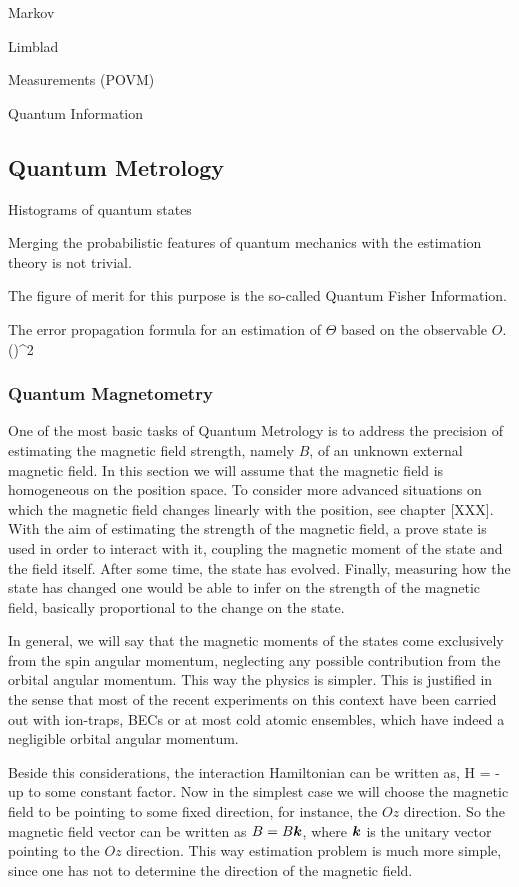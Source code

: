 Markov

Limblad

Measurements (POVM)

Quantum Information

\subsection{Quantum Metrology}

Histograms of quantum states

Merging the probabilistic features of quantum mechanics with the estimation theory is not trivial.

The figure of merit for this purpose is the so-called Quantum Fisher Information.

The error propagation formula for an estimation of $\Theta$ based on the observable $O$.
\be
  (\Delta \Theta)^2 \geq {}
\ee

\subsubsection{Quantum Magnetometry}
\label{sec:bg-quantum-metro}

One of the most basic tasks of Quantum Metrology is to address the precision of estimating the magnetic field strength, namely $B$, of an unknown external magnetic field.
In this section we will assume that the magnetic field is homogeneous on the position space.
To consider more advanced situations on which the magnetic field changes linearly with the position, see chapter [XXX].
With the aim of estimating the strength of the magnetic field, a prove state is used in order to interact with it, coupling the magnetic moment of the state and the field itself.
After some time, the state has evolved.
Finally, measuring how the state has changed one would be able to infer on the strength of the magnetic field, basically proportional to the change on the state.

In general, we will say that the magnetic moments of the states come exclusively from the spin angular momentum, neglecting any possible contribution from the orbital angular momentum.
This way the physics is simpler.
This is justified in the sense that most of the recent experiments on this context have been carried out with ion-traps, BECs or at most cold atomic ensembles, which have indeed a negligible orbital angular momentum.

Beside this considerations, the interaction Hamiltonian can be written as,
\be
  H = - \bs{\mu} \cdot {}
\ee
up to some constant factor.
Now in the simplest case we will choose the magnetic field to be pointing to some fixed direction, for instance, the $Oz$ direction.
So the magnetic field vector can be written as ${B}=B\boldsymbol{k}$, where $\boldsymbol{k}$ is the unitary vector pointing to the $Oz$ direction.
This way estimation problem is much more simple, since one has not to determine the direction of the magnetic field.


